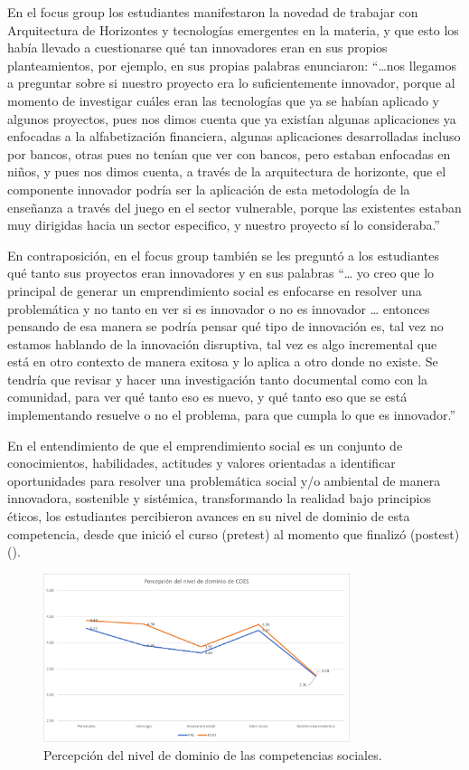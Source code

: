 \documentclass[spanish]{textolivre}
\begin{document}
En el focus group los estudiantes manifestaron la novedad de trabajar con Arquitectura de Horizontes y tecnologías emergentes  en la materia, y que esto los había llevado a cuestionarse qué tan innovadores eran en sus propios planteamientos, por ejemplo, en sus propias palabras enunciaron: “…nos llegamos a preguntar sobre si nuestro proyecto era lo suficientemente innovador, porque al momento de investigar cuáles eran las tecnologías que ya se habían aplicado y algunos proyectos, pues nos dimos cuenta que ya existían algunas aplicaciones ya enfocadas a la alfabetización financiera, algunas aplicaciones desarrolladas incluso por bancos, otras pues no tenían que ver con bancos, pero estaban enfocadas en niños, y pues nos dimos cuenta, a través de la arquitectura de horizonte, que el componente innovador podría ser la aplicación de esta metodología de la enseñanza a través del juego en el sector vulnerable, porque las existentes estaban muy dirigidas hacia un sector especifico, y nuestro proyecto sí lo consideraba.”

En contraposición, en el focus group también se les preguntó a los estudiantes qué tanto sus proyectos eran innovadores y en sus palabras “… yo creo que lo principal de generar un emprendimiento social es enfocarse en resolver una problemática y no tanto en ver si es innovador o no es innovador … entonces pensando de esa manera se podría pensar qué tipo de innovación es, tal vez no estamos hablando de la innovación disruptiva, tal vez es algo incremental que está en otro contexto de manera exitosa y lo aplica a otro donde no existe. Se tendría que revisar y hacer una investigación tanto documental como con la comunidad, para ver qué tanto eso es nuevo, y qué tanto eso que se está implementando resuelve o no el problema, para que cumpla lo que es innovador.”

En el entendimiento de que el emprendimiento social es un conjunto de conocimientos, habilidades, actitudes y valores orientadas a identificar oportunidades para resolver una problemática social y/o ambiental de manera innovadora, sostenible y sistémica, transformando la realidad bajo principios éticos, los estudiantes percibieron avances en su nivel de dominio de esta competencia, desde que inició el curso (pretest) al momento que finalizó (postest) ().

\begin{figure}[htbp]
 \centering
 \includegraphics[width=0.8\textwidth]{fig4-25716.png}
 \caption{Percepción del nivel de dominio de las competencias sociales.}
 \label{fig4}
\end{figure}
\end{document}
